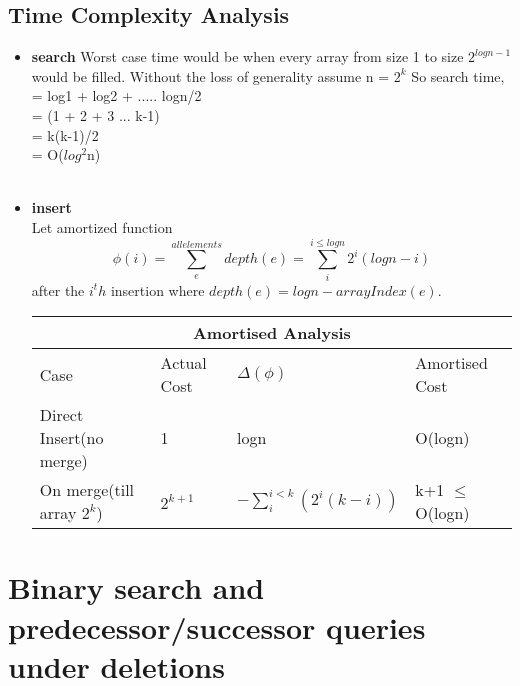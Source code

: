 \documentclass{article}
\begin{document}
\subsection{Time Complexity Analysis}
\begin{itemize}
  \item \textbf{search} Worst case time would be when every array from size 1 to size $2^{logn-1}$ would be filled. Without the loss of generality assume n = $2^k$
    So search time,\\
    = log1 + log2 + $.....$ logn/2 \\
    = (1 + 2 + 3 $...$ k-1) \\
    = k(k-1)/2 \\
    = O($log^2$n) \\
    \\
  \item \textbf{insert}\\
    Let amortized function $$\phi(i) = \sum_{e}^{all elements}depth(e)  = \sum_{i}^{i \leq logn} 2^i(logn - i) $$ after the $i^th$ insertion where $depth(e) = logn - arrayIndex(e)$.\\
    \begin{tabular}{|p{4cm}|p{3cm}|p{3cm}|p{3cm}|  }
      \hline
      \multicolumn{4}{|c|}{Amortised Analysis} \\
      \hline
      Case & Actual Cost& $\Delta(\phi)$ & Amortised Cost\\
      \hline
      Direct Insert(no merge) & 1           & logn & O(logn)   \\
      On merge(till array $2^k$) & $2^{k+1}$   & $-\sum_{i}^{i<k} (2^i(k-i))$ & k+1 $\leq$ O(logn) \\
      \hline
    \end{tabular}

\end{itemize}

\newpage
\section{Binary search and predecessor/successor queries under deletions}
\end{document}
